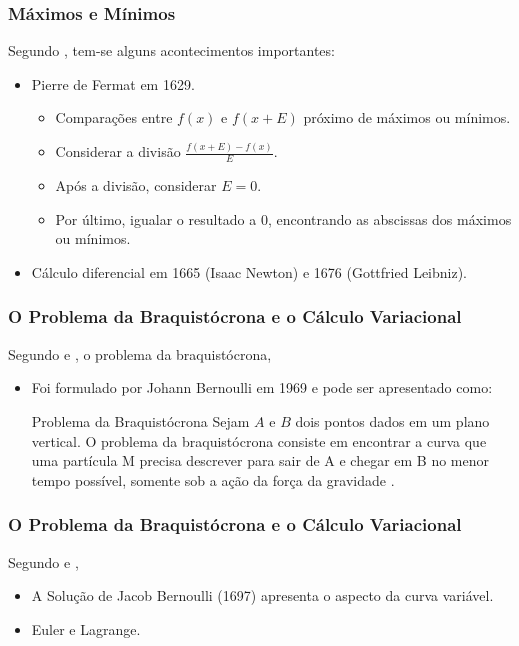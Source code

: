 \documentclass{beamer}
\begin{document}
	\begin{frame}
		\frametitle{Máximos e Mínimos}
		\justify
	
		Segundo , tem-se alguns acontecimentos importantes:
		\begin{itemize}
			\item Pierre de Fermat em 1629.
			\pause
			\begin{itemize}
				\item Comparações entre $f(x)$ e $f(x+E)$ próximo de máximos ou mínimos.
				\pause
				\item Considerar a divisão $\frac{f(x+E)-f(x)}{E}$.
				\pause
				\item Após a divisão, considerar $E=0$.
				\pause
				\item Por último, igualar o resultado a $0$, encontrando as abscissas dos máximos ou mínimos.
			\end{itemize}
			\pause
			\item Cálculo diferencial em 1665 (Isaac Newton) e 1676 (Gottfried Leibniz).
		\end{itemize}
	\end{frame}

	\begin{frame}
		\frametitle{O Problema da Braquistócrona e o Cálculo Variacional}
		\justify
	
		Segundo  e , o problema da braquistócrona,
		\begin{itemize}
			\item Foi formulado por Johann Bernoulli em 1969 e pode ser apresentado como:
			\begin{block}{Problema da Braquistócrona}
				Sejam $A$ e $B$ dois pontos dados em um plano vertical. O problema da braquistócrona consiste em encontrar a curva que uma partícula M precisa descrever para sair de A e chegar em B no menor tempo possível, somente sob a ação da força da gravidade \cite[p. 3]{calcvar}.
			\end{block}
		\end{itemize}
	\end{frame}

	\begin{frame}
		\frametitle{O Problema da Braquistócrona e o Cálculo Variacional}
		\justify

		Segundo  e \citeonline{hist_still},
		\begin{itemize}
			\item A Solução de Jacob Bernoulli (1697) apresenta o aspecto da curva variável.
			\pause
		
			\item Euler e Lagrange.
		\end{itemize}
	\end{frame}
	
\end{document}
